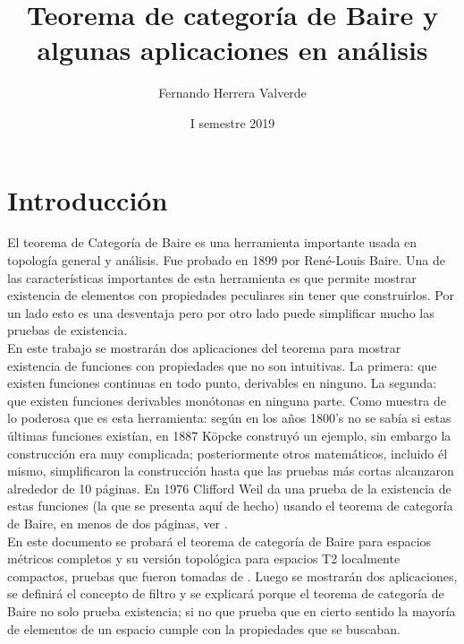 \documentclass{article}
\title{Teorema de categoría de Baire y algunas aplicaciones en análisis}
\author{Fernando Herrera Valverde}
\date{I semestre 2019}
\theoremstyle{definition}
\begin{document}
\maketitle

\section{Introducción}

El teorema de Categoría de Baire es una herramienta importante usada en topología general y análisis. Fue probado en 1899 por René-Louis Baire. Una de las características importantes de esta herramienta es que permite mostrar existencia de elementos con propiedades peculiares sin tener que construirlos. Por un lado esto es una desventaja pero por otro lado puede simplificar mucho las pruebas de existencia.\\
En este trabajo se mostrarán dos aplicaciones del teorema para mostrar existencia de funciones con propiedades que no son intuitivas. La primera: que existen funciones continuas en todo punto, derivables en ninguno. La segunda: que existen funciones derivables monótonas en ninguna parte.
Como muestra de lo poderosa que es esta herramienta: según \cite{jones97} en los años 1800's no se sabía si estas últimas funciones existían, en 1887 Köpcke construyó un ejemplo, sin embargo la construcción era muy complicada; posteriormente otros matemáticos, incluido él mismo, simplificaron la construcción hasta que las pruebas más cortas alcanzaron alrededor de 10 páginas. En 1976 Clifford Weil da una prueba de la existencia de estas funciones (la que se presenta aquí de hecho) usando el teorema de categoría de Baire, en menos de dos páginas, ver \cite{weil76}.\\
En este documento se probará el teorema de categoría de Baire para espacios métricos completos y su versión topológica para espacios T2 localmente compactos, pruebas que fueron tomadas de \cite{munkres00}. Luego se mostrarán dos aplicaciones, se definirá el concepto de filtro y se explicará porque el teorema de categoría de Baire no solo prueba existencia; si no que prueba que en cierto sentido la mayoría de elementos de un espacio cumple con la propiedades que se buscaban. 
\end{document}
